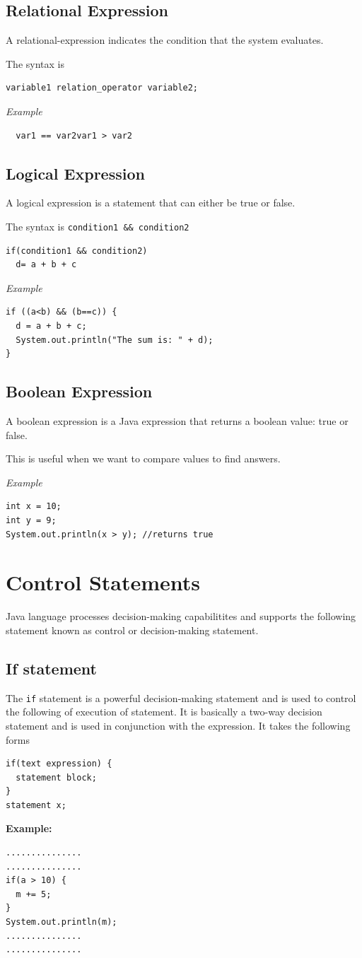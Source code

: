 \documentclass[twocolumn, a4paper]{article}
\begin{document}
\subsection{Relational Expression}
A relational-expression indicates the condition that the system evaluates.

The syntax is
\begin{verbatim}
variable1 relation_operator variable2;
\end{verbatim}
\noindent\emph{Example}
\begin{verbatim}
  var1 == var2var1 > var2
\end{verbatim}

\subsection{Logical Expression}
A logical expression is a statement that can either be true or false.

The syntax is \verb+condition1 && condition2+
\begin{verbatim}
if(condition1 && condition2)
  d= a + b + c
\end{verbatim}
\noindent\emph{Example}
\begin{lstlisting}
if ((a<b) && (b==c)) {
  d = a + b + c;
  System.out.println("The sum is: " + d);
}
\end{lstlisting}

\subsection{Boolean Expression}
A boolean expression is a Java expression that returns a boolean value: true
or false.

This is useful when we want to compare values to find answers.

\noindent\emph{Example}
\begin{lstlisting}
int x = 10;
int y = 9;
System.out.println(x > y); //returns true
\end{lstlisting}

\section{Control Statements}
Java language processes decision-making capabilitites and supports the
following statement known as control or decision-making statement.

\subsection{If statement}
The \texttt{if} statement is a powerful decision-making statement and is used
to control the following of execution of statement. It is basically a two-way
decision statement and is used in conjunction with the expression. It takes
the following forms
\begin{lstlisting}
if(text expression) {
  statement block;
}
statement x;
\end{lstlisting}
\vskip10pt
\textbf{Example:}
\begin{lstlisting}
...............
...............
if(a > 10) {
  m += 5;
}
System.out.println(m);
...............
...............
\end{lstlisting}
\end{document}
